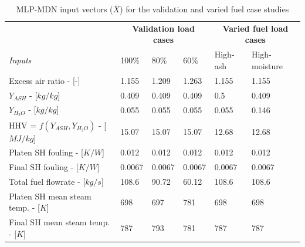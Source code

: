 \documentclass[a4paper,fleqn]{cas-sc}
\begin{document}
\begin{table}[h!]
\caption{MLP-MDN input vectors ($\overline{X}$) for the validation and varied fuel case studies}\label{tbl_inputs}
\begin{tabular*}{\tblwidth}{lp{}p{}p{}p{}p{}}
\toprule
 & \multicolumn{3}{c}{\textbf{Validation load cases}}&\multicolumn{2}{c}{\textbf{Varied fuel load cases}}\\
\textit{Inputs}& 100\%  & 80\% & 60\% & High-ash & High-moisture  \\
\midrule
Excess air ratio - [-] & 1.155 & 1.209 & 1.263 & 1.155 & 1.155  \\
$Y_{ASH}$ - [$kg/kg$] & 0.409 & 0.409 &  0.409 &0.5 & 0.409  \\
$Y_{H_{2}O}$ - [$kg/kg$] & 0.055 & 0.055 & 0.055 & 0.055 & 0.146  \\
HHV = $f(Y_{ASH},Y_{H_{2}O})$ - [$MJ/kg$] & 15.07 & 15.07 & 15.07 & 12.68 & 12.68  \\
Platen SH fouling - [$K/W$]& 0.012 & 0.012 & 0.012 & 0.012 & 0.012  \\
Final SH fouling - [$K/W$] & 0.0067&0.0067 &0.0067 & 0.0067&0.0067  \\
Total fuel flowrate - [$kg/s$] &108.6 & 90.72 & 60.12 &108.6 & 108.6 \\
Platen SH mean steam temp. - [$K$] & 698 &697&781 &698 &698  \\
Final SH mean steam temp. - [$K$]& 787 & 793 &781 &787 &787  \\
\bottomrule
\end{tabular*}
\end{table}  
\end{document}
